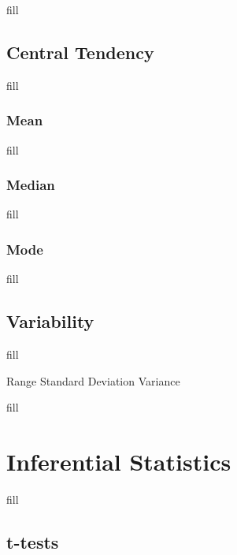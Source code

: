 \documentclass[
  b5paper]{book}
\begin{document}
fill

\hypertarget{central-tendency}{%
\subsection*{Central Tendency}\label{central-tendency}}

fill

\hypertarget{mean}{%
\subsubsection*{Mean}\label{mean}}

fill

\hypertarget{median}{%
\subsubsection*{Median}\label{median}}

fill

\hypertarget{mode}{%
\subsubsection*{Mode}\label{mode}}

fill

\hypertarget{variability}{%
\subsection*{Variability}\label{variability}}

fill

Range Standard Deviation Variance

fill

\hypertarget{inferential-statistics}{%
\section{Inferential Statistics}\label{inferential-statistics}}

fill

\hypertarget{t-tests}{%
\subsection*{t-tests}\label{t-tests}}
\end{document}
